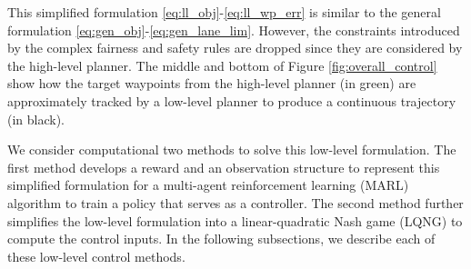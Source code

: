 This simplified formulation \eqref{eq:ll_obj}-\eqref{eq:ll_wp_err} is similar to the general formulation \eqref{eq:gen_obj}-\eqref{eq:gen_lane_lim}. However, the constraints introduced by the complex fairness and safety rules are dropped since they are considered by the high-level planner. The middle and bottom of Figure \ref{fig:overall_control} show how the target waypoints from the high-level planner (in green) are approximately tracked by a low-level planner to produce a continuous trajectory (in black). 

We consider computational two methods to solve this low-level formulation. The first method develops a reward and an observation structure to represent this simplified formulation for a multi-agent reinforcement learning (MARL) algorithm to train a policy that serves as a controller. The second method further simplifies the low-level formulation into a linear-quadratic Nash game (LQNG) to compute the control inputs. In the following subsections, we describe each of these low-level control methods.

